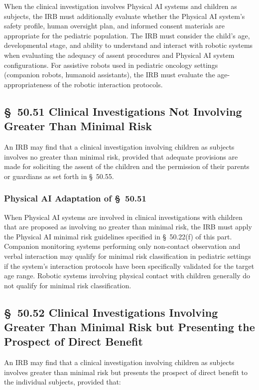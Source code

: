 \documentclass[11pt]{article}
\begin{document}
When the clinical investigation involves Physical AI systems and children as subjects, the IRB must additionally evaluate whether the Physical AI system's safety profile, human oversight plan, and informed consent materials are appropriate for the pediatric population. The IRB must consider the child's age, developmental stage, and ability to understand and interact with robotic systems when evaluating the adequacy of assent procedures and Physical AI system configurations. For assistive robots used in pediatric oncology settings (companion robots, humanoid assistants), the IRB must evaluate the age-appropriateness of the robotic interaction protocols.

\subsection{\S~50.51 Clinical Investigations Not Involving Greater Than Minimal Risk}

An IRB may find that a clinical investigation involving children as subjects involves no greater than minimal risk, provided that adequate provisions are made for soliciting the assent of the children and the permission of their parents or guardians as set forth in \S~50.55.

\subsubsection{Physical AI Adaptation of \S~50.51}

When Physical AI systems are involved in clinical investigations with children that are proposed as involving no greater than minimal risk, the IRB must apply the Physical AI minimal risk guidelines specified in \S~50.22(f) of this part. Companion monitoring systems performing only non-contact observation and verbal interaction may qualify for minimal risk classification in pediatric settings if the system's interaction protocols have been specifically validated for the target age range. Robotic systems involving physical contact with children generally do not qualify for minimal risk classification.

\subsection{\S~50.52 Clinical Investigations Involving Greater Than Minimal Risk but Presenting the Prospect of Direct Benefit}

An IRB may find that a clinical investigation involving children as subjects involves greater than minimal risk but presents the prospect of direct benefit to the individual subjects, provided that:
\end{document}
